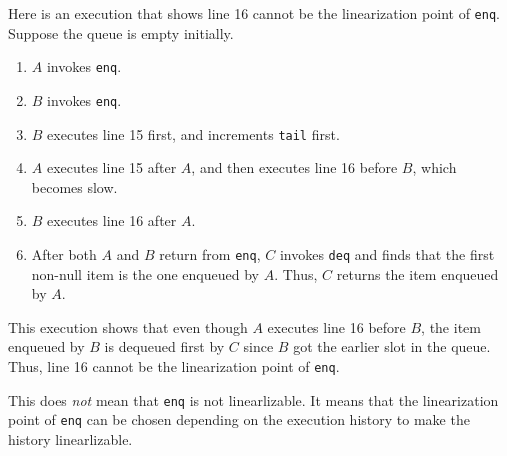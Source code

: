 \documentclass[conference,compsoc]{IEEEtran}
\begin{document}
\begin{enumerate}
    Here is an execution that shows line 16 cannot be the linearization point of
    \texttt{enq}. Suppose the queue is empty initially. 
    \begin{enumerate}
        \item \(A\) invokes \texttt{enq}.
        \item \(B\) invokes \texttt{enq}.
        \item \(B\) executes line 15 first, and increments \texttt{tail} first.
        \item \(A\) executes line 15 after \(A\), and then executes line 16
        before \(B\), which becomes slow.
        \item \(B\) executes line 16 after \(A\).
        \item After both \(A\) and \(B\) return from \texttt{enq}, \(C\) invokes
        \texttt{deq} and finds that the first non-null item is the one enqueued
        by \(A\). Thus, \(C\) returns the item enqueued by \(A\).
    \end{enumerate}
    This execution shows that even though \(A\) executes line 16 before \(B\),
    the item enqueued by \(B\) is dequeued first by \(C\) since \(B\) got the
    earlier slot in the queue. Thus, line 16 cannot be the linearization point
    of \texttt{enq}.

    This does \emph{not} mean that \texttt{enq} is not linearlizable. It means
    that the linearization point of \texttt{enq} can be chosen depending on the
    execution history to make the history linearlizable.
\end{enumerate}
\end{document}
